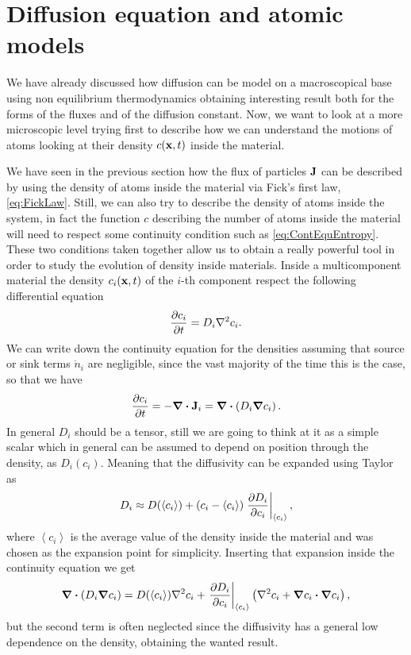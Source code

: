\section{Diffusion equation and atomic models}

We have already discussed how diffusion can be model on a macroscopical base using non equilibrium thermodynamics obtaining interesting result both for the forms of the fluxes and of the diffusion constant. Now, we want to look at a more microscopic level trying first to describe how we can understand the motions of atoms looking at their density $c(\vb{x}, t)$ inside the material.

We have seen in the previous section how the flux of particles $\vb{J}$ can be described by using the density of atoms inside the material via Fick's first law, \eqref{eq:FickLaw}. Still, we can also try to describe the density of atoms inside the system, in fact the function $c$ describing the number of atoms inside the material will need to respect some continuity condition such as \eqref{eq:ContEquEntropy}. These two conditions taken together allow us to obtain a really powerful tool in order to study the evolution of density inside materials.
{
    Inside a multicomponent material the density $c_i(\vb{x}, t)$ of the $i$-th component respect the following differential equation
    \begin{equation}
        \label{eq:SecFickLaw}
        \pdv{c_i}{t} = D_i \laplacian c_i.
    \end{equation}
}
{
    We can write down the continuity equation for the densities assuming that source or sink terms $\dot{n}_i$ are negligible, since the vast majority of the time this is the case, so that we have
    \begin{equation}
        \pdv{c_i}{t} = -\grad\vdot\vb{J}_i = \grad\vdot\left( D_i\grad c_i \right).
    \end{equation}
    In general $D_i$ should be a tensor, still we are going to think at it as a simple scalar which in general can be assumed to depend on position through the density, as $D_i(c_i)$. Meaning that the diffusivity can be expanded using Taylor as
    \begin{equation}
        D_i \approx D(\left\langle c_i \right\rangle) + \left( c_i - \left\langle c_i \right\rangle \right)\eval{\pdv{D_i}{c_i}}_{\left\langle c_i \right\rangle},
    \end{equation}
    where $\left\langle c_i \right\rangle$ is the average value of the density inside the material and was chosen as the expansion point for simplicity. Inserting that expansion inside the continuity equation we get
    \begin{equation}
        \grad\vdot\left( D_i\grad c_i \right) = D(\left\langle c_i \right\rangle)\laplacian c_i + \eval{\pdv{D_i}{c_i}}_{\left\langle c_i \right\rangle} \left( \laplacian c_i + \grad c_i \vdot \grad c_i \right),
    \end{equation}
    but the second term is often neglected since the diffusivity has a general low dependence on the density, obtaining the wanted result.
}

